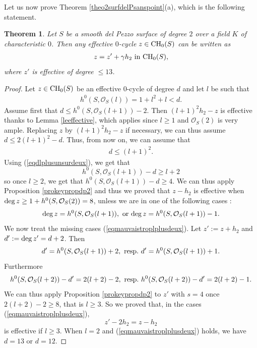 \documentclass[10pt]{article}
\newtheorem{theo}{Theorem}[section]
\begin{document}
Let us now  prove Theorem \ref{theo2surfdelPsanspoint}(a), which is the following statement.
\begin{theo} \label{theogrosseborne} Let $S$ be a smooth del Pezzo surface of degree $2$ over a field $K$ of characteristic $0$. Then any effective $0$-cycle $z\in{\rm CH}_0(S)$ can be written as
\begin{eqnarray}\label{eqpourfindp2suppl}
 z=z'+\gamma h_2\,\,{\rm in}\,\,{\rm CH}_0(S),
\end{eqnarray}
where $z'$ is effective of degree $\leq 13$.
\end{theo}
\begin{proof} Let $z\in {\rm CH}_0(S)$ be an effective $0$-cycle of degree $d$ and let $l$ be such that
\begin{eqnarray}\label{eqcrucialpourvbdp2} h^0(S,\mathcal{O}_S(l))=1+l^2+l< d.\end{eqnarray}
Assume first that $d\leq h^0(S,\mathcal{O}_S(l+1))-2$. Then $(l+1)^2h_2-z$ is effective thanks to Lemma \ref{leeffective}, which applies since $l\geq 1$ and $\mathcal{O}_S(2)$ is very ample. Replacing $z$ by $(l+1)^2h_2-z$ if necessary, we can thus assume
$d\leq 2(l+1)^2-d$.
 Thus,  from now on, we can assume that
\begin{eqnarray}\label{eqdlplusunsurdeux} d\leq (l+1)^2.
\end{eqnarray}
Using (\ref{eqdlplusunsurdeux}), we get that
$$h^0(S,\mathcal{O}_S(l+1))-d\geq l+2$$
so once $l\geq 2$, we get that $h^0(S,\mathcal{O}_S(l+1))-d\geq 4$. We can
thus apply Proposition \ref{prokeypropdp2} and thus we proved  that $z-h_2$ is effective when ${\rm deg}\,z\geq 1+h^0(S,\mathcal{O}_S(2))=8$, unless we are in one of the following cases :
\begin{eqnarray}\label{eqmauvaistroplplusdeux}{\rm deg}\,z=h^0(S,\mathcal{O}_S(l+1)),\,\,{\rm or}\,\, {\rm deg}\,z=h^0(S,\mathcal{O}_S(l+1))-1.\end{eqnarray}
We now treat  the  missing cases  (\ref{eqmauvaistroplplusdeux}). Let $z':=z+h_2$ and $d':={\rm deg}\,z'=d+2$. Then
$$d'=h^0(S,\mathcal{O}_S(l+1))+2,\,\,{\rm  resp.}\,\,d'=h^0(S,\mathcal{O}_S(l+1))+1.$$ Furthermore
$$h^0(S,\mathcal{O}_S(l+2))-d'=2(l+2)-2,\,\,
{\rm resp.}\,\, h^0(S,\mathcal{O}_S(l+2))-d'=2(l+2)-1.$$
We can thus  apply  Proposition \ref{prokeypropdp2} to $z'$ with $s=4$ once $2(l+2)-2\geq 8$, that is $l\geq 3$.  So we proved that, in the  cases  (\ref{eqmauvaistroplplusdeux}),
$$z'-2h_2=z-h_2$$ is effective if $l\geq 3$. When $l=2$ and (\ref{eqmauvaistroplplusdeux}) holds, we have $d=13$ or $d=12$.

\end{proof}
\end{document}
